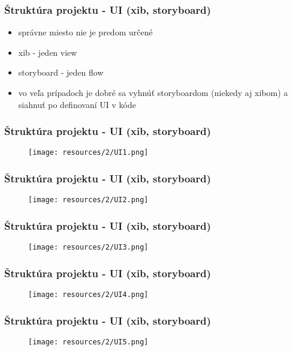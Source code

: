 \documentclass[serif,mathserif]{beamer}
\begin{document}
\begin{frame}
  \frametitle{Štruktúra projektu - UI (xib, storyboard)}
  \begin{itemize}
  \item správne miesto nie je predom určené \pause
  \item xib - jeden view \pause
  \item storyboard - jeden flow \pause
  \item vo veľa prípadoch je dobré sa vyhnúť storyboardom (niekedy aj xibom) a siahnuť po definovaní UI v kóde
  \end{itemize}
\end{frame}

\begin{frame}
  \frametitle{Štruktúra projektu - UI (xib, storyboard)}
 \begin{figure}[h]
	\texttt{[image: resources/2/UI1.png]}
  \end{figure}
\end{frame}

\begin{frame}
  \frametitle{Štruktúra projektu - UI (xib, storyboard)}
 \begin{figure}[h]
	\texttt{[image: resources/2/UI2.png]}
  \end{figure}
\end{frame}

\begin{frame}
  \frametitle{Štruktúra projektu - UI (xib, storyboard)}
 \begin{figure}[h]
	\texttt{[image: resources/2/UI3.png]}
  \end{figure}
\end{frame}

\begin{frame}
  \frametitle{Štruktúra projektu - UI (xib, storyboard)}
 \begin{figure}[h]
	\texttt{[image: resources/2/UI4.png]}
  \end{figure}
\end{frame}

\begin{frame}
  \frametitle{Štruktúra projektu - UI (xib, storyboard)}
 \begin{figure}[h]
	\texttt{[image: resources/2/UI5.png]}
  \end{figure}
\end{frame}
\end{document}
